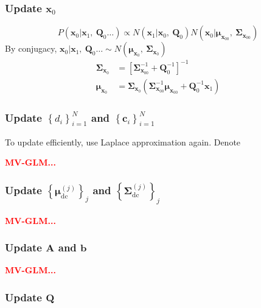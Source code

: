 \documentclass[]{article}
\begin{document}
\subsubsection{Update \(\mathbf{x}_{0}\)}
\[P\left( \mathbf{x}_{0}|\mathbf{x}_{1},\ \mathbf{Q}_{0}\ldots \right) \propto N(\mathbf{x}_{1}|\mathbf{x}_{0},\ \mathbf{Q}_{0})N(\mathbf{x}_{0}|\bm{\mu}_{\mathbf{x}_{00}},\ \mathbf{\Sigma}_{\mathbf{x}_{00}})\]
By conjugacy, \(\mathbf{x}_{0}|\mathbf{x}_{1},\ \mathbf{Q}_{0}\ldots \sim N(\bm{\mu}_{\mathbf{x}_{0}},\ \mathbf{\Sigma}_{\mathbf{x}_{0}})\)
\begin{align*}
	\mathbf{\Sigma}_{\mathbf{x}_{0}} &= \left\lbrack \mathbf{\Sigma}_{\mathbf{x}_{00}}^{- 1} + \mathbf{Q}_{0}^{- 1} \right\rbrack^{- 1}\\
	\bm{\mu}_{\mathbf{x}_{0}} &= \mathbf{\Sigma}_{\mathbf{x}_{0}}\left( \mathbf{\Sigma}_{\mathbf{x}_{00}}^{- 1}\bm{\mu}_{\mathbf{x}_{00}} + \mathbf{Q}_{0}^{- 1}\mathbf{x}_{1} \right)
\end{align*}

\subsubsection{Update \(\left\{ d_{i} \right\}_{i = 1}^{N}\) and
	\(\left\{ \mathbf{c}_{i} \right\}_{i = 1}^{N}\)}
To update efficiently, use Laplace approximation again. Denote

\textcolor{red}{\textbf{MV-GLM...}}\\

\subsubsection{Update \(\left\{ \mathbf{\mu}_{\text{dc}}^{(j)} \right\}_{j}\) and \(\left\{ \mathbf{\Sigma}_{\text{dc}}^{(j)} \right\}_{j}\)} \label{loading prior}

\textcolor{red}{\textbf{MV-GLM...}}\\

\subsubsection{Update \(\mathbf{A}\) and \(\mathbf{b}\)} \label{dynamics update}

\textcolor{red}{\textbf{MV-GLM...}}\\

\subsubsection{Update \(\mathbf{Q}\)}
\end{document}

